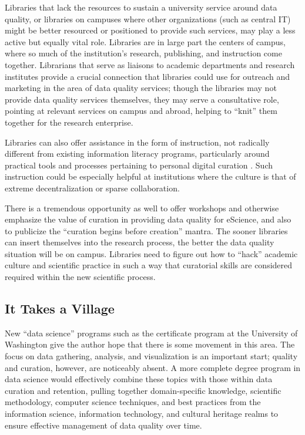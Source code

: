 \documentclass[12pt,letterpaper,titlepage,onecolumn,biblatex,backend=biber,style=chicago-authordate]{article}
\begin{document}
Libraries that lack the resources to sustain a university service
around data quality, or libraries on campuses where other
organizations (such as central IT) might be better resourced or
positioned to provide such services, may play a less active but
equally vital role. Libraries are in large part the centers of campus,
where so much of the institution's research, publishing, and
instruction come together. Librarians that serve as liaisons to
academic departments and research institutes provide a crucial
connection that libraries could use for outreach and marketing in the
area of data quality services; though the libraries may not provide
data quality services themselves, they may serve a consultative role,
pointing at relevant services on campus and abroad, helping to
``knit'' them together for the research enterprise.

Libraries can also offer assistance in the form of instruction, not
radically different from existing information literacy programs,
particularly around practical tools and processes pertaining to
personal digital curation \autocite{williams:lifecycle}. Such instruction
could be especially helpful at institutions where the culture is that
of extreme decentralization or sparse collaboration.

There is a tremendous opportunity as well to offer workshops and
otherwise emphasize the value of curation in providing data quality
for eScience, and also to publicize the ``curation begins before
creation'' mantra. The sooner libraries can insert themselves into the
research process, the better the data quality situation will be on
campus. Libraries need to figure out how to ``hack'' academic culture
and scientific practice in such a way that curatorial skills are
considered required within the new scientific process.

\subsection{It Takes a Village}

New ``data science'' programs such as the certificate program at the
University of Washington \autocite{uw:datascience} give the author hope
that there is some movement in this area. The focus on data gathering,
analysis, and visualization is an important start; quality and
curation, however, are noticeably absent. A more complete degree
program in data science would effectively combine these topics with
those within data curation and retention, pulling together
domain-specific knowledge, scientific methodology, computer science
techniques, and best practices from the information science,
information technology, and cultural heritage realms to ensure
effective management of data quality over time.
\end{document}

